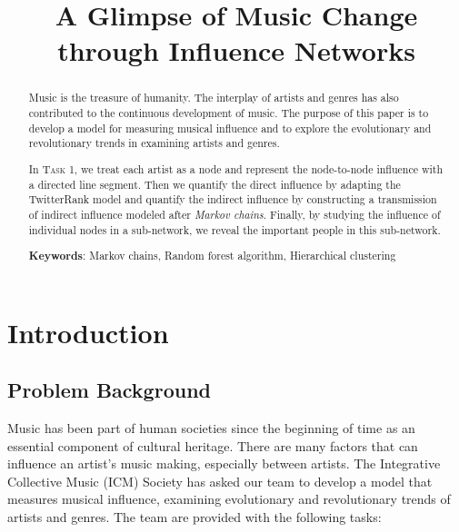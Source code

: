 \documentclass[12pt]{article}  %
\title{A Glimpse of Music Change through Influence Networks}  %
\begin{document}
\begin{abstract}
	
	Music is the treasure of humanity. The interplay of artists and genres has also contributed to the continuous development of music. The purpose of this paper is to develop a model for measuring musical influence and to explore the evolutionary and revolutionary trends in examining artists and genres.
	
	In \textsc{Task 1}, we treat each artist as a node and represent the node-to-node influence with a directed line segment. Then we quantify the direct influence by adapting the TwitterRank model and quantify the indirect influence by constructing a transmission of indirect influence modeled after \textit{Markov chains}. Finally, by studying the influence of individual nodes in a sub-network, we reveal the important people in this sub-network.
	

	
	
	
	
	
	\vspace{5pt}
	\textbf{Keywords}: Markov chains, Random forest algorithm, Hierarchical clustering 
	
\end{abstract}
    
\maketitle  %

\tableofcontents




\section{Introduction}

\subsection{Problem Background}
Music has been part of human societies since the beginning of time as an essential component of cultural heritage. There are many factors that can influence an artist's music making, especially between artists. The Integrative Collective Music (ICM) Society has asked our team to develop a model that measures musical influence, examining evolutionary and revolutionary trends of artists and genres.
The team are provided with the following tasks:
\end{document}
